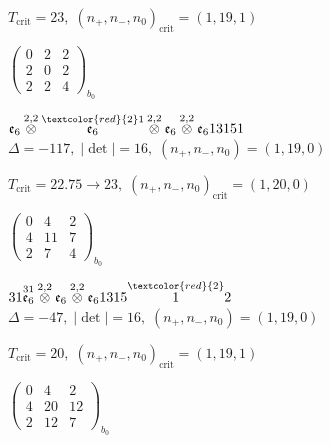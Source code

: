 \documentclass[10pt]{article}
\begin{document}
\hspace{1em}$T_{\text{crit}}=23,\; (n_+,n_-,n_0)_{\text{crit}}=(1,19,1)$

\hspace{2em}$\left(\begin{smallmatrix}0 & 2 & 2 \\ 2 & 0 & 2 \\ 2 & 2 & 4\end{smallmatrix}\right)_{\!b_0}$

\smallskip

$\mathfrak{e}_6\overset{2,2}{\otimes}\overset{\textcolor{red}{2}1}{\mathfrak{e}_6}\overset{2,2}{\otimes}\mathfrak{e}_6\overset{2,2}{\otimes}\mathfrak{e}_613151$ \quad $\Delta=-117,\; |\det|=16,\; (n_+,n_-,n_0)=(1,19,0)$

\hspace{1em}$T_{\text{crit}}=22.75 \to 23,\; (n_+,n_-,n_0)_{\text{crit}}=(1,20,0)$

\hspace{2em}$\left(\begin{smallmatrix}0 & 4 & 2 \\ 4 & 11 & 7 \\ 2 & 7 & 4\end{smallmatrix}\right)_{\!b_0}$

\smallskip

$31\overset{31}{\mathfrak{e}_6}\overset{2,2}{\otimes}\mathfrak{e}_6\overset{2,2}{\otimes}\mathfrak{e}_61315\overset{\textcolor{red}{2}}{1}2$ \quad $\Delta=-47,\; |\det|=16,\; (n_+,n_-,n_0)=(1,19,0)$

\hspace{1em}$T_{\text{crit}}=20,\; (n_+,n_-,n_0)_{\text{crit}}=(1,19,1)$

\hspace{2em}$\left(\begin{smallmatrix}0 & 4 & 2 \\ 4 & 20 & 12 \\ 2 & 12 & 7\end{smallmatrix}\right)_{\!b_0}$

\smallskip
\end{document}
